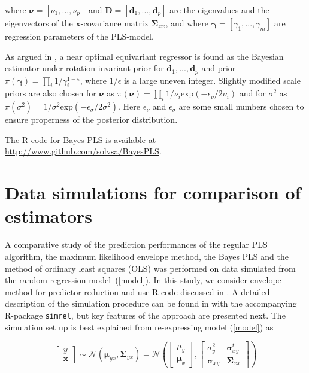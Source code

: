 \documentclass[a4paper, 11pt]{article}
\begin{document}
where $\bm{\nu}=[\nu_1,...,\nu_p]$ and $\bm{D}=[\bm{d}_1,...,\bm{d}_p]$ are the eigenvalues and the eigenvectors of the $\bm{x}$-covariance matrix $\bm{\Sigma}_{xx}$, and where $\bm{\gamma}=[\gamma_1,...,\gamma_m]$ are regression parameters of the PLS-model.

As argued in \citet{helland2012near}, a near optimal equivariant regressor is
found as the Bayesian estimator under rotation invariant prior for
$\bm{d}_1,...,\bm{d}_p$ and prior $\pi(\bm{\gamma})=\prod_i
1/\gamma_i^{1-\epsilon}$, where $1/\epsilon$ is a large uneven integer. Slightly
modified scale priors are also chosen for $\bm{\nu}$ as $\pi(\bm{\nu}) =\prod_i
1/\nu_i \mathrm{exp}(-\epsilon_\nu/2\nu_i)$ and for $\sigma^2$ as$ \pi(\sigma^2)=1/\sigma^2\mathrm{exp}(-\epsilon_\sigma/2\sigma^2)$. Here $\epsilon_\nu$ and $\epsilon_\sigma$ are some small numbers chosen to ensure properness of the posterior distribution.

The R-code for Bayes PLS is available at \href{http://www.github.com/solvsa/BayesPLS}{http://www.github.com/solvsa/BayesPLS}.


\section{Data simulations for comparison of estimators}
\label{sec:data-simulation}

A comparative study of the prediction performances of the regular PLS algorithm,
the maximum likelihood envelope method, the Bayes PLS and the method of ordinary least squares (OLS) was performed on data simulated from the random regression model~(\ref{model}). In this study, we consider envelope method for predictor reduction \citep{cook2013envelopes} and use R-code discussed in \citet{cook2016note}. A detailed description of the simulation procedure can be found in \citep{saebo2015simrel} with the accompanying R-package {\tt simrel}, but key features of the approach are presented next. The simulation set up is best explained from re-expressing model (\ref{model}) as

\begin{equation}
  \label{eq:rand-reg-model}
  \begin{bmatrix}
    y \\ \mathbf{x}
  \end{bmatrix} \sim
  \mathcal{N}\left( \boldsymbol{\mu}_{yx}, \boldsymbol{\Sigma}_{yx} \right) =
  \mathcal{N}\left(
    \begin{bmatrix}
      \mu_y \\ \boldsymbol{\mu}_x
    \end{bmatrix},
    \begin{bmatrix}
      \sigma_y^2               & \boldsymbol{\sigma}_{xy}^t \\
      \boldsymbol{\sigma}_{xy} & \boldsymbol{\Sigma}_{xx}
    \end{bmatrix}
  \right)
\end{equation}
\end{document}
